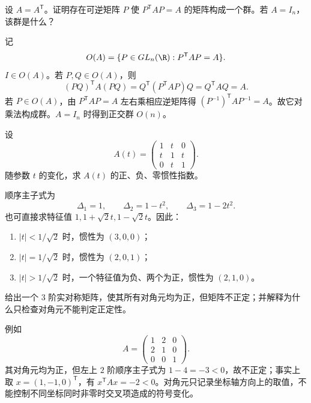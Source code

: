 \begin{exercise}[level=advanced]
设 $A=A^{\mathsf T}$。证明存在可逆矩阵 $P$ 使 $P^{\mathsf T}AP=A$ 的矩阵构成一个群。若 $A=I_n$，该群是什么？
\begin{solution}
记
\[
O(A)=\{P\in GL_n(\R):P^{\mathsf T}AP=A\}.
\]
$I\in O(A)$。若 $P,Q\in O(A)$，则
\[
(PQ)^{\mathsf T}A(PQ)=Q^{\mathsf T}(P^{\mathsf T}AP)Q=Q^{\mathsf T}AQ=A.
\]
若 $P\in O(A)$，由 $P^{\mathsf T}AP=A$ 左右乘相应逆矩阵得 $(P^{-1})^{\mathsf T}AP^{-1}=A$。故它对乘法构成群。$A=I_n$ 时得到正交群 $O(n)$。
\end{solution}
\end{exercise}

\begin{exercise}[level=advanced]
设
\[
A(t)=\begin{pmatrix}
1&t&0\\
t&1&t\\
0&t&1
\end{pmatrix}.
\]
随参数 $t$ 的变化，求 $A(t)$ 的正、负、零惯性指数。
\begin{solution}
顺序主子式为
\[
\Delta_1=1,\qquad \Delta_2=1-t^2,\qquad \Delta_3=1-2t^2.
\]
也可直接求特征值 $1,1+\sqrt2t,1-\sqrt2t$。因此：
\begin{enumerate}[label=(\arabic*)]
\item $|t|<1/\sqrt2$ 时，惯性为 $(3,0,0)$；
\item $|t|=1/\sqrt2$ 时，惯性为 $(2,0,1)$；
\item $|t|>1/\sqrt2$ 时，一个特征值为负、两个为正，惯性为 $(2,1,0)$。
\end{enumerate}
\end{solution}
\end{exercise}

\begin{exercise}[level=advanced]
给出一个 $3$ 阶实对称矩阵，使其所有对角元均为正，但矩阵不正定；并解释为什么只检查对角元不能判定正定性。
\begin{solution}
例如
\[
A=\begin{pmatrix}1&2&0\\2&1&0\\0&0&1\end{pmatrix}.
\]
其对角元均为正，但左上 $2$ 阶顺序主子式为 $1-4=-3<0$，故不正定；事实上取 $x=(1,-1,0)^{\mathsf T}$，有 $x^{\mathsf T}Ax=-2<0$。对角元只记录坐标轴方向上的取值，不能控制不同坐标同时非零时交叉项造成的符号变化。
\end{solution}
\end{exercise}

